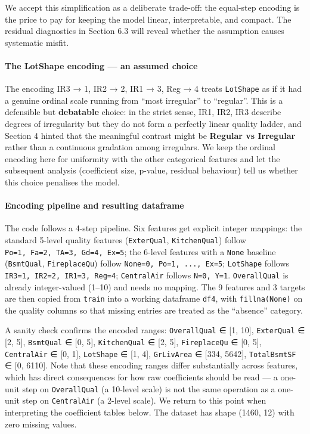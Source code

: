 We accept this simplification as a deliberate trade-off: the equal-step
encoding is the price to pay for keeping the model linear,
interpretable, and compact. The residual diagnostics in Section 6.3 will
reveal whether the assumption causes systematic misfit.

\paragraph{The LotShape encoding --- an assumed
choice}\label{the-lotshape-encoding-an-assumed-choice}

The encoding IR3 → 1, IR2 → 2, IR1 → 3, Reg → 4 treats \texttt{LotShape}
as if it had a genuine ordinal scale running from ``most irregular'' to
``regular''. This is a defensible but \textbf{debatable} choice: in the
strict sense, IR1, IR2, IR3 describe degrees of irregularity but they do
not form a perfectly linear quality ladder, and Section 4 hinted that
the meaningful contrast might be \textbf{Regular vs Irregular} rather
than a continuous gradation among irregulars. We keep the ordinal
encoding here for uniformity with the other categorical features and let
the subsequent analysis (coefficient size, p-value, residual behaviour)
tell us whether this choice penalises the model.

\paragraph{Encoding pipeline and resulting
dataframe}\label{encoding-pipeline-and-resulting-dataframe}

The code follows a 4-step pipeline. Six features get explicit integer
mappings: the standard 5-level quality features (\texttt{ExterQual},
\texttt{KitchenQual}) follow \texttt{Po=1,\ Fa=2,\ TA=3,\ Gd=4,\ Ex=5};
the 6-level features with a \texttt{None} baseline (\texttt{BsmtQual},
\texttt{FireplaceQu}) follow \texttt{None=0,\ Po=1,\ ...,\ Ex=5};
\texttt{LotShape} follows \texttt{IR3=1,\ IR2=2,\ IR1=3,\ Reg=4};
\texttt{CentralAir} follows \texttt{N=0,\ Y=1}. \texttt{OverallQual} is
already integer-valued (1--10) and needs no mapping. The 9 features and
3 targets are then copied from \texttt{train} into a working dataframe
\texttt{df4}, with
\texttt{fillna(\textquotesingle{}None\textquotesingle{})} on the quality
columns so that missing entries are treated as the ``absence'' category.

A sanity check confirms the encoded ranges: \texttt{OverallQual} ∈ {[}1,
10{]}, \texttt{ExterQual} ∈ {[}2, 5{]}, \texttt{BsmtQual} ∈ {[}0, 5{]},
\texttt{KitchenQual} ∈ {[}2, 5{]}, \texttt{FireplaceQu} ∈ {[}0, 5{]},
\texttt{CentralAir} ∈ {[}0, 1{]}, \texttt{LotShape} ∈ {[}1, 4{]},
\texttt{GrLivArea} ∈ {[}334, 5642{]}, \texttt{TotalBsmtSF} ∈ {[}0,
6110{]}. Note that these encoding ranges differ substantially across
features, which has direct consequences for how raw coefficients should
be read --- a one-unit step on \texttt{OverallQual} (a 10-level scale)
is not the same operation as a one-unit step on \texttt{CentralAir} (a
2-level scale). We return to this point when interpreting the
coefficient tables below. The dataset has shape (1460, 12) with zero
missing values.

